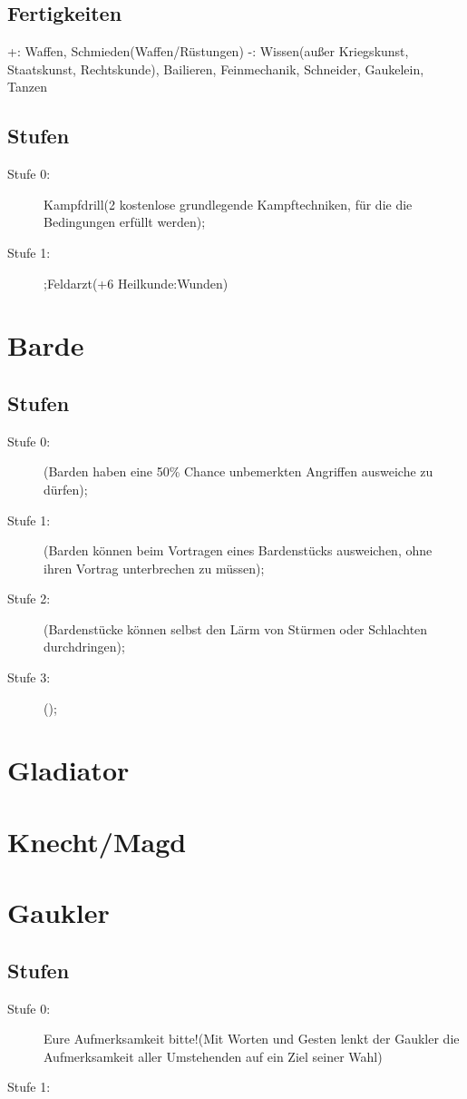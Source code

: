 \documentclass[a4paper,12pt,oneside]{book}
\begin{document}
\subsection{Fertigkeiten}
+: Waffen, Schmieden(Waffen/Rüstungen)
-: Wissen(außer Kriegskunst, Staatskunst, Rechtskunde), Bailieren, Feinmechanik, Schneider, Gaukelein, Tanzen
\subsection{Stufen}
\begin{description}
\item[Stufe 0:]Kampfdrill(2 kostenlose grundlegende Kampftechniken, für die die Bedingungen erfüllt werden);
\item[Stufe 1:];Feldarzt(+6 Heilkunde:Wunden)
\end{description}
\section{Barde}
\subsection{Stufen}
\begin{description}
\item[Stufe 0:](Barden haben eine 50\% Chance unbemerkten Angriffen ausweiche zu dürfen); 
\item[Stufe 1:](Barden können beim Vortragen eines Bardenstücks ausweichen, ohne ihren Vortrag unterbrechen zu müssen);
\item[Stufe 2:](Bardenstücke können selbst den Lärm von Stürmen oder Schlachten durchdringen);
\item[Stufe 3:]();
\end{description}
\section{Gladiator}
\section{Knecht/Magd}
\section{Gaukler}
\subsection{Stufen}
\begin{description}
\item[Stufe 0:]Eure Aufmerksamkeit bitte!(Mit Worten und Gesten lenkt der Gaukler die Aufmerksamkeit aller Umstehenden auf ein Ziel seiner Wahl)
\item[Stufe 1:]
\end{description}
\end{document}
